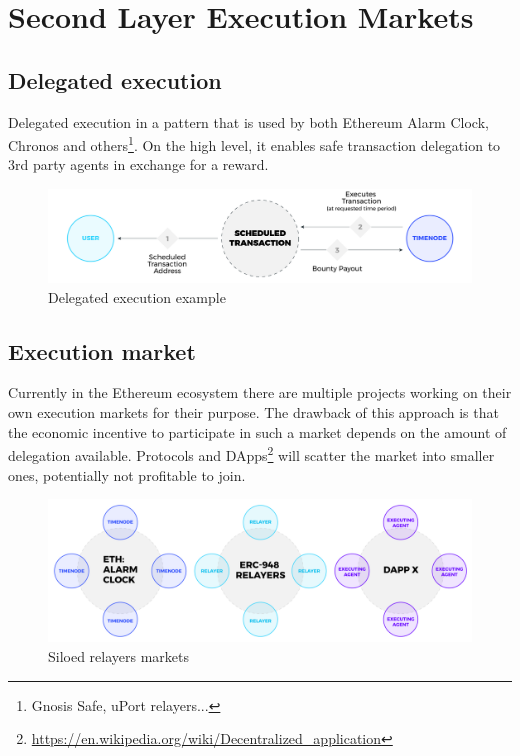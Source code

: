 \documentclass{report}
\begin{document}
  \chapter{Second Layer Execution Markets}
  \section{Delegated execution}
  Delegated execution in a pattern that is used by both Ethereum Alarm Clock, Chronos and others\footnote{Gnosis Safe, uPort relayers...}. On the high level, it enables safe transaction delegation to 3rd party agents in exchange for a reward.

  \begin{figure}[h]
    \includegraphics[width=\textwidth]{delegated_execution}
    \caption{Delegated execution example}
  \end{figure}

  \section{Execution market}

  Currently in the Ethereum ecosystem there are multiple projects working on their own execution markets for their purpose. The drawback of this approach is that the economic incentive to participate in such a market depends on the amount of delegation available. Protocols and DApps\footnote{\url{https://en.wikipedia.org/wiki/Decentralized_application}} will scatter the market into smaller ones, potentially not profitable to join.

  \begin{figure}[h]
    \includegraphics[width=\textwidth]{silos}
    \caption{Siloed relayers markets}
  \end{figure}
\end{document}
